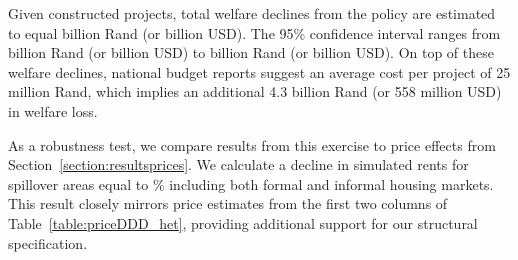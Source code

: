 \documentclass[12pt]{article}
\begin{document}

Given constructed projects, total welfare declines from the policy are estimated to equal billion Rand (or billion USD).  The 95\% confidence interval ranges from billion Rand (or billion USD) to billion Rand (or billion USD).  On top of these welfare declines, national budget reports suggest an average cost per project of 25 million Rand, which implies an additional 4.3 billion Rand (or 558 million USD) in welfare loss.  

As a robustness test, we compare results from this exercise to price effects from Section~\ref{section:resultsprices}.  We calculate a decline in simulated rents for spillover areas equal to \unskip\% including both formal and informal housing markets.  This result closely mirrors price estimates from the first two columns of Table~\ref{table:priceDDD_het}, providing additional support for our structural specification.

\end{document}
